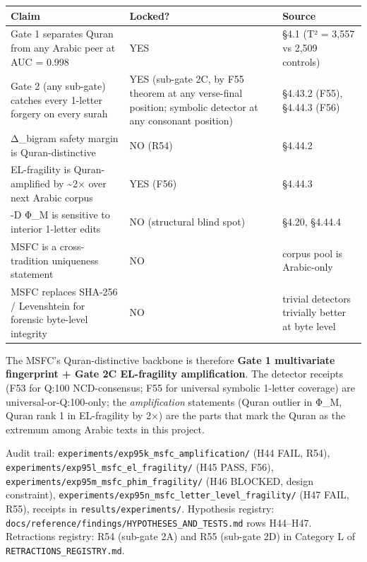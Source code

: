 \documentclass[
]{article}
\newcounter{none} %
\begin{document}
{\def\LTcaptype{none} %
\begin{longtable}[]{@{}
  >{\raggedright\arraybackslash}p{}
  >{\raggedright\arraybackslash}p{}
  >{\raggedright\arraybackslash}p{}@{}}
\toprule\noalign{}
\begin{minipage}[b]{\linewidth}\raggedright
Claim
\end{minipage} & \begin{minipage}[b]{\linewidth}\raggedright
Locked?
\end{minipage} & \begin{minipage}[b]{\linewidth}\raggedright
Source
\end{minipage} \\
\midrule\noalign{}
\endhead
\bottomrule\noalign{}
\endlastfoot
Gate 1 separates Quran from any Arabic peer at AUC = 0.998 & YES & §4.1
(T² = 3,557 vs 2,509 controls) \\
Gate 2 (any sub-gate) catches every 1-letter forgery on every surah &
YES (sub-gate 2C, by F55 theorem at any verse-final position; symbolic
detector at any consonant position) & §4.43.2 (F55), §4.44.3 (F56) \\
Δ\_bigram safety margin is Quran-distinctive & NO (R54) & §4.44.2 \\
EL-fragility is Quran-amplified by \textasciitilde2× over next Arabic
corpus & YES (F56) & §4.44.3 \\
5-D Φ\_M is sensitive to interior 1-letter edits & NO (structural blind
spot) & §4.20, §4.44.4 \\
MSFC is a cross-tradition uniqueness statement & NO & corpus pool is
Arabic-only \\
MSFC replaces SHA-256 / Levenshtein for forensic byte-level integrity &
NO & trivial detectors trivially better at byte level \\
\end{longtable}
}

The MSFC's Quran-distinctive backbone is therefore \textbf{Gate 1
multivariate fingerprint + Gate 2C EL-fragility amplification}. The
detector receipts (F53 for Q:100 NCD-consensus; F55 for universal
symbolic 1-letter coverage) are universal-or-Q:100-only; the
\emph{amplification} statements (Quran outlier in Φ\_M, Quran rank 1 in
EL-fragility by 2×) are the parts that mark the Quran as the extremum
among Arabic texts in this project.

Audit trail: \texttt{experiments/exp95k\_msfc\_amplification/} (H44
FAIL, R54), \texttt{experiments/exp95l\_msfc\_el\_fragility/} (H45 PASS,
F56), \texttt{experiments/exp95m\_msfc\_phim\_fragility/} (H46 BLOCKED,
design constraint),
\texttt{experiments/exp95n\_msfc\_letter\_level\_fragility/} (H47 FAIL,
R55), receipts in \texttt{results/experiments/}. Hypothesis registry:
\texttt{docs/reference/findings/HYPOTHESES\_AND\_TESTS.md} rows
H44--H47. Retractions registry: R54 (sub-gate 2A) and R55 (sub-gate 2D)
in Category L of \texttt{RETRACTIONS\_REGISTRY.md}.
\end{document}
